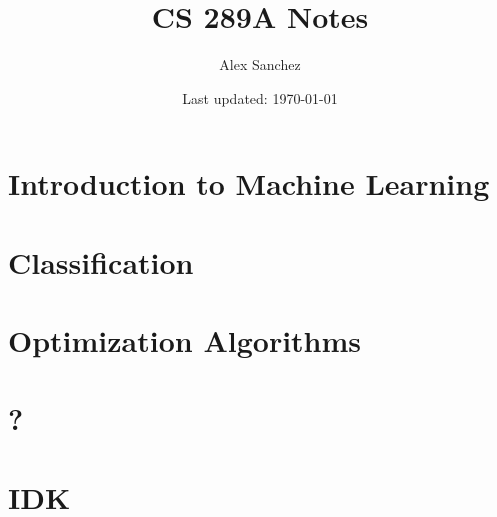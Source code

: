 \documentclass[openany]{book}
\title{CS 289A Notes}
\author{Alex Sanchez}
\date{Last updated: \today}
\begin{document}
\maketitle

\tableofcontents

\chapter{Introduction to Machine Learning}


\chapter{Classification}


\chapter{Optimization Algorithms}



\chapter{?}


\chapter{IDK}

\end{document}
